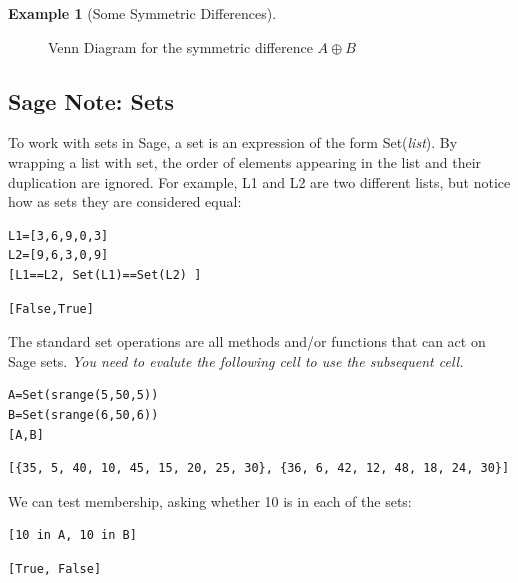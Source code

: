 \documentclass[10pt,]{book}
\theoremstyle{plain}
\theoremstyle{definition}
\theoremstyle{definition}
\theoremstyle{definition}
\newtheorem{example}[theorem]{Example}
\theoremstyle{definition}
\begin{document}
\begin{example}[Some Symmetric Differences]
\begin{figure}
\caption{Venn Diagram for the symmetric difference \(A \oplus  B\)\label{venn_diagram_symmetric}}
\end{figure}
\end{example}
\typeout{************************************************}
\typeout{************************************************}
\subsection[Sage Note: Sets]{Sage Note: Sets}\label{Sage_Note_Sets-1-2}
To work with sets in Sage, a set is an expression of the form  Set(\emph{list}).  By wrapping a list with set, the order of elements appearing in the list and their duplication are ignored.  For example, L1 and L2 are two different lists, but notice how as sets they are considered equal:%
\begin{lstlisting}[style=sageinput]
L1=[3,6,9,0,3]
L2=[9,6,3,0,9]
[L1==L2, Set(L1)==Set(L2) ]
\end{lstlisting}
\begin{lstlisting}[style=sageoutput]
[False,True]
\end{lstlisting}
\par
The standard set operations are all methods and/or functions that can act on Sage sets. \emph{You need to evalute the following cell to use the subsequent cell.}%
\begin{lstlisting}[style=sageinput]
A=Set(srange(5,50,5))
B=Set(srange(6,50,6))
[A,B]
\end{lstlisting}
\begin{lstlisting}[style=sageoutput]
[{35, 5, 40, 10, 45, 15, 20, 25, 30}, {36, 6, 42, 12, 48, 18, 24, 30}]
\end{lstlisting}
\par

We can test membership, asking whether 10 is in each of the sets:
%
\begin{lstlisting}[style=sageinput]
[10 in A, 10 in B]
\end{lstlisting}
\begin{lstlisting}[style=sageoutput]
[True, False]
\end{lstlisting}
\par
\end{document}
